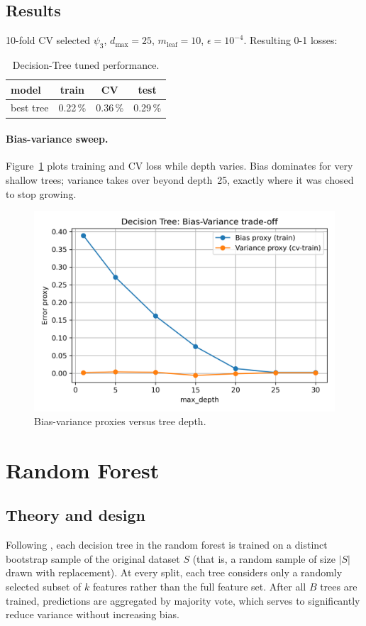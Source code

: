 \documentclass[12pt]{report}
\begin{document}
\subsection{Results}
10-fold CV selected $\psi_3$, $d_{\max}=25$, $m_{\text{leaf}}=10$,
$\epsilon=10^{-4}$.  Resulting 0-1 losses:

\begin{table}[ht]
  \centering
  \caption{Decision-Tree tuned performance.}
  \label{tab:tree-res}
  \begin{tabular}{lccc}
    \toprule
    model & train & CV & test \\ \midrule
    best tree & 0.22\,\% & 0.36\,\% & 0.29\,\% \\
    \bottomrule
  \end{tabular}
\end{table}

\paragraph{Bias-variance sweep.}
Figure~\ref{fig:tree-bv} plots training and CV loss while depth varies. Bias
dominates for very shallow trees; variance takes over beyond depth~25, exactly
where it was chosed to stop growing.

\begin{figure}[ht]
  \centering
  \includegraphics[width=.65\linewidth]{../plots/tree_sweep_bias_variance_approx.png}
  \caption{Bias-variance proxies versus tree depth.}
  \label{fig:tree-bv}
\end{figure}

\section{Random Forest}

\subsection{Theory and design}
Following \citet[p.,256]{shalev}, each decision tree in the random forest is trained on a 
distinct bootstrap sample of the original dataset $S$ (that is, a random sample of size 
$|S|$ drawn with replacement). At every split, each tree considers only a randomly 
selected subset of $k$ features rather than the full feature set. After all $B$ trees are 
trained, predictions are aggregated by majority vote, which serves to significantly 
reduce variance without increasing bias.
\end{document}
